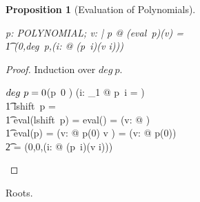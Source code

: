 \documentclass[12pt]{scrartcl}
\newtheorem{prop}{Proposition}[section]
\begin{document}
\begin{prop}[Evaluation of Polynomials]
  \label{prop:evalutation}
  \begin{zed}
    \forall p: POLYNOMIAL; v: \real | p \neq \zeropol @ (eval~p)(v) = \\
    \t1 \finsum(0,deg~p,(\lambda i: \nat @ (p~i)\amult(v \apwr i)))
  \end{zed}
\end{prop}

\begin{proof}
  Induction over $deg~p$.
  \begin{argue}
    $deg~p = 0$\quad \vdash (p~0 \neq \azero) \land (\forall i:
    \nat_1 @ p~i = \azero)\\
    \t1 \vdash lshift~p = \zeropol\\
    \t1 \vdash eval(lshift~p) = eval(\zeropol) = (\lambda v: \real @
    \azero)\\
    \t1 \vdash eval(p) = (\lambda v: \real @ p(0) \aplus v \amult
    \azero) = (\lambda v: \real @ p(0))\\
    \t2 = \finsum(0,0,(\lambda i: \nat @ (p~i)\amult(v \apwr i)))
  \end{argue}
\end{proof}

Roots.
% 
\printbibliography{}

\end{document}
